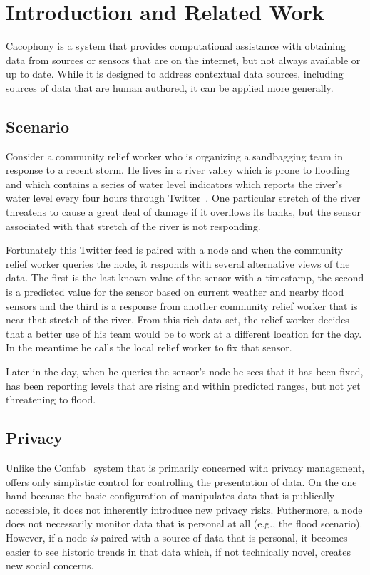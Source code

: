 \section{Introduction and Related Work}

Cacophony is a system that provides computational assistance with 
obtaining data from sources or sensors that are on the internet, but not always
available or up to date.  While it is designed to address contextual data
sources, including sources of data that are human authored, it can be applied
more generally.

\subsection{Scenario}

Consider a community relief worker who is organizing a sandbagging team in
response to a recent storm.  He lives in a river valley which is prone to
flooding and which contains a series of water level indicators which reports the
river's water level every four hours through Twitter~\cite{Starbird2010,flood}.
One particular stretch of the river threatens to cause a great deal of damage if it
overflows its banks, but the sensor associated with that stretch of the river is not
responding.

Fortunately this Twitter feed is paired with a \Cacophony node and when the
community relief worker queries the \Cacophony node, it responds with several
alternative views of the data.  The first is the last known value of the sensor
with a timestamp, the second is a predicted value for the sensor based on
current weather and nearby flood sensors and the third is a response from
another community relief worker that is near that stretch of the river.  From
this rich data set, the relief worker decides that a better use of his team would be 
to work at a different location for the day.  In the meantime he calls the local
relief worker to fix that sensor.

Later in the day, when he queries the sensor's \Cacophony node he sees that it
has been fixed, has been reporting levels that are rising and within predicted
ranges, but not yet threatening to flood.


\subsection{Privacy}

Unlike the Confab~\cite{Hong2004} system that is primarily concerned with
privacy management, \Cacophony offers only simplistic control for controlling
the presentation of data.  On the one hand because the basic configuration of \Cacophony
manipulates data that is publically accessible, it does not inherently introduce
new privacy risks.  Futhermore, a \Cacophony node does not necessarily monitor
data that is personal at all (e.g., the flood scenario).   However, if a
\Cacophony node \emph{is} paired with a source of data that is
personal, it becomes easier to see historic trends in that data which, if not
technically novel, creates new social concerns.  

